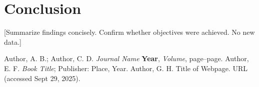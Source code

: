 \documentclass[11pt,letterpaper]{article}
\begin{document}
\section*{Conclusion}
[Summarize findings concisely. Confirm whether objectives were achieved. No new data.]

\newpage
{}
\begin{thebibliography}{9}
 Author, A. B.; Author, C. D. \textit{Journal Name} \textbf{Year}, \textit{Volume}, page–page.  
 Author, E. F. \textit{Book Title}; Publisher: Place, Year.  
 Author, G. H. Title of Webpage. URL (accessed Sept 29, 2025).
\end{thebibliography}
\end{document}
